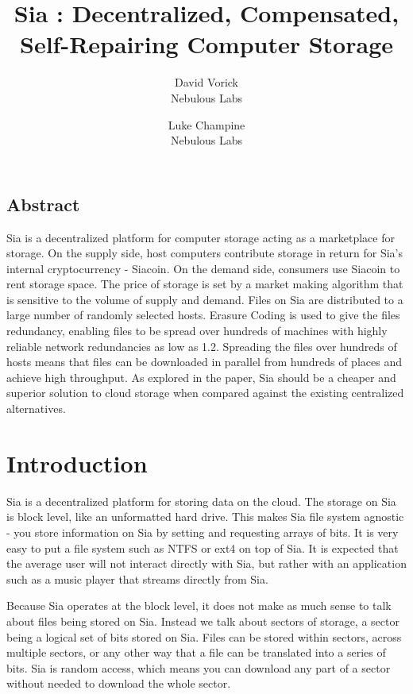 \documentclass[twocolumn]{article}
\begin{document}
\frenchspacing

\title{Sia : Decentralized, Compensated, Self-Repairing Computer Storage}

\author{
{\rm David Vorick}\\
Nebulous Labs
\and
{\rm Luke Champine}\\
Nebulous Labs
}

\maketitle

\subsection*{Abstract}
Sia is a decentralized platform for computer storage acting as a marketplace for storage.
On the supply side, host computers contribute storage in return for Sia's internal cryptocurrency - Siacoin.
On the demand side, consumers use Siacoin to rent storage space.
The price of storage is set by a market making algorithm that is sensitive to the volume of supply and demand.
Files on Sia are distributed to a large number of randomly selected hosts.
Erasure Coding is used to give the files redundancy, enabling files to be spread over hundreds of machines with highly reliable network redundancies as low as 1.2.
Spreading the files over hundreds of hosts means that files can be downloaded in parallel from hundreds of places and achieve high throughput.
As explored in the paper, Sia should be a cheaper and superior solution to cloud storage when compared against the existing centralized alternatives.

\section{Introduction}
Sia is a decentralized platform for storing data on the cloud.
The storage on Sia is block level, like an unformatted hard drive.
This makes Sia file system agnostic - you store information on Sia by setting and requesting arrays of bits.
It is very easy to put a file system such as NTFS or ext4 on top of Sia.
It is expected that the average user will not interact directly with Sia, but rather with an application such as a music player that streams directly from Sia.

Because Sia operates at the block level, it does not make as much sense to talk about files being stored on Sia.
Instead we talk about sectors of storage, a sector being a logical set of bits stored on Sia.
Files can be stored within sectors, across multiple sectors, or any other way that a file can be translated into a series of bits.
Sia is random access, which means you can download any part of a sector without needed to download the whole sector.
\end{document}
